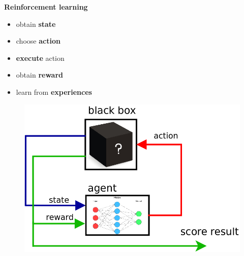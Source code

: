 \documentclass[xcolor=dvipsnames]{beamer}
\begin{document}
\begin{frame}{\bf Reinforcement learning}

\begin{itemize}
  \item obtain {\bf state}
  \item choose {\bf action}
  \item {\bf execute} action
  \item obtain {\bf reward}
  \item learn from {\bf experiences}
\end{itemize}

  \begin{figure}
    \includegraphics[scale=0.3]{../../diagrams/rl_mechanism.png}
  \end{figure}

\end{frame}
\end{document}
